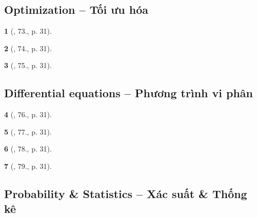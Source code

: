 \documentclass{article}
\newtheorem{baitoan}{}
\begin{document}

\subsection{Optimization -- Tối ưu hóa}

\begin{baitoan}[\cite{Doanh_Tuan_Pascal}, 73., p. 31]
	
\end{baitoan}

\begin{baitoan}[\cite{Doanh_Tuan_Pascal}, 74., p. 31]
	
\end{baitoan}

\begin{baitoan}[\cite{Doanh_Tuan_Pascal}, 75., p. 31]
	
\end{baitoan}


\subsection{Differential equations -- Phương trình vi phân}

\begin{baitoan}[\cite{Doanh_Tuan_Pascal}, 76., p. 31]
	
\end{baitoan}

\begin{baitoan}[\cite{Doanh_Tuan_Pascal}, 77., p. 31]
	
\end{baitoan}

\begin{baitoan}[\cite{Doanh_Tuan_Pascal}, 78., p. 31]
	
\end{baitoan}

\begin{baitoan}[\cite{Doanh_Tuan_Pascal}, 79., p. 31]
	
\end{baitoan}


\subsection{Probability \& Statistics -- Xác suất \& Thống kê}
\end{document}
